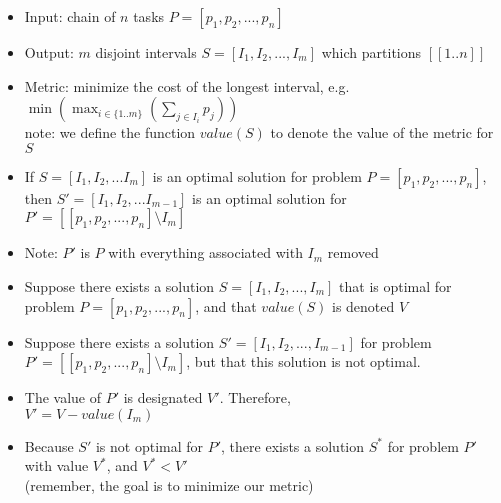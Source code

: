 \documentclass[landscape]{slides}
\begin{document}

\begin{slide} %
	\begin{itemize}
    \item Input: chain of $n$ tasks $P = [p_1, p_2, ..., p_n]$
    \item Output: $m$ disjoint intervals  $S = [I_1, I_2, ..., I_m]$ which
    			partitions $[[1..n]]$
    \item Metric: minimize the cost of the longest interval, e.g.
					$\min(\max_{i\in\{1..m\}}(\sum_{j \in{I_i}} p_j))$
					\\note: we define the function $value (S)$ to denote the value of 
					the metric for $S$
	\end{itemize}
\end{slide}

\begin{slide} %
	\begin{itemize}
	\item If $S = [I_1, I_2, ... I_m]$ is an optimal solution for problem 
	$P = [p_1, p_2, ..., p_n]$, then $S' = [I_1, I_2, ... I_{m-1}]$ is an optimal
	solution for $P' = [[p_1, p_2, ..., p_n] \setminus I_m]$
	\item Note: $P'$ is $P$ with everything associated with $I_m$ removed
	\end{itemize}
\end{slide}

\begin{slide} %
	\begin{itemize}
		\item Suppose there exists a solution 
		$S = [I_1, I_2, ..., I_m]$ that is optimal for problem 
		$P = [p_1, p_2, ..., p_n]$, and that $value(S)$ is denoted $V$
		\item Suppose there exists a solution $S' = [I_1, I_2, ..., I_{m-1}]$
		for problem $P'= [[p_1, p_2, ..., p_n] \setminus I_m]$, but that this
		solution is not optimal.
		\item The value of $P'$ is designated $V'$. Therefore, 
		\\$V' = V - value(I_m)$
		\item Because $S'$ is not optimal for $P'$, there exists a solution $S^*$
		for problem $P'$ with value $V^*$, and $V^* < V'$ \\(remember, the goal is
		to minimize our metric) 
	\end{itemize}
\end{slide}
\end{document}
